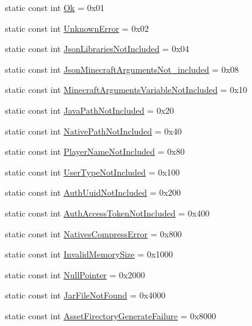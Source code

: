 \begin{DoxyCompactItemize}
\item 
static const int \mbox{\hyperlink{namespace_launcher_error_acbc00056e5b3673743adfd67b798251f}{Ok}} = 0x01
\item 
static const int \mbox{\hyperlink{namespace_launcher_error_a6cc141372d9692cfa045f1445568d55b}{Unknown\+Error}} = 0x02
\item 
static const int \mbox{\hyperlink{namespace_launcher_error_a357befd62d4d79606f781936ea9fe8b5}{Json\+Libraries\+Not\+Included}} = 0x04
\item 
static const int \mbox{\hyperlink{namespace_launcher_error_ad2f22ade49877365c9f8b2838ba46754}{Json\+Minecraft\+Arguments\+Not\+\_\+included}} = 0x08
\item 
static const int \mbox{\hyperlink{namespace_launcher_error_a8ffd93247c038c038cf2ef41384de038}{Minecraft\+Arguments\+Variable\+Not\+Included}} = 0x10
\item 
static const int \mbox{\hyperlink{namespace_launcher_error_aeb5368a1d9198695b24e272446eda7c7}{Java\+Path\+Not\+Included}} = 0x20
\item 
static const int \mbox{\hyperlink{namespace_launcher_error_a4cd6b94dce1b7fc9a2abdb0b3649158a}{Native\+Path\+Not\+Included}} = 0x40
\item 
static const int \mbox{\hyperlink{namespace_launcher_error_aa49bcd0aaea19eee474ab92c08b52420}{Player\+Name\+Not\+Included}} = 0x80
\item 
static const int \mbox{\hyperlink{namespace_launcher_error_a95566a00793dd91eb8a4c8a4d5f52c5b}{User\+Type\+Not\+Included}} = 0x100
\item 
static const int \mbox{\hyperlink{namespace_launcher_error_acfae5f933075bdd385f18050120113a9}{Auth\+Uuid\+Not\+Included}} = 0x200
\item 
static const int \mbox{\hyperlink{namespace_launcher_error_a2ea25ae458ef407d11d60ca252cdf185}{Auth\+Access\+Token\+Not\+Included}} = 0x400
\item 
static const int \mbox{\hyperlink{namespace_launcher_error_adbc67787c5c5d4802a7b02bbc0926328}{Natives\+Compress\+Error}} = 0x800
\item 
static const int \mbox{\hyperlink{namespace_launcher_error_a83564a9f9f9327034ccf4f7c75e01548}{Invalid\+Memory\+Size}} = 0x1000
\item 
static const int \mbox{\hyperlink{namespace_launcher_error_a0e036f49764f65ef3fd80c236f07f158}{Null\+Pointer}} = 0x2000
\item 
static const int \mbox{\hyperlink{namespace_launcher_error_abedee76b822b7e5a7c6a6e6a08f67ed3}{Jar\+File\+Not\+Found}} = 0x4000
\item 
static const int \mbox{\hyperlink{namespace_launcher_error_adafb1ded371bd029471ac0e25dec883d}{Asset\+Firectory\+Generate\+Failure}} = 0x8000
\end{DoxyCompactItemize}



